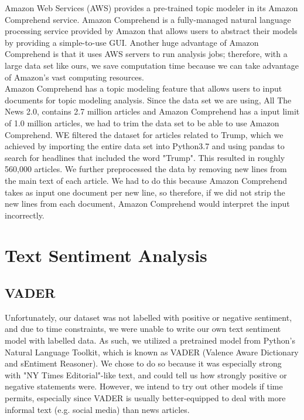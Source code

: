 \documentclass[12pt, letter-paper]{article}
\begin{document}
Amazon Web Services (AWS) provides a pre-trained topic modeler in its Amazon Comprehend service. Amazon Comprehend is a fully-managed natural language processing service provided by Amazon that allows users to abstract their models by providing a simple-to-use GUI. Another huge advantage of Amazon Comprehend is that it uses AWS servers to run analysis jobs; therefore, with a large data set like ours, we save computation time because we can take advantage of Amazon's vast computing resources. \\

Amazon Comprehend has a topic modeling feature that allows users to input documents for topic modeling analysis. Since the data set we are using, All The News 2.0, contains 2.7 million articles and Amazon Comprehend has a input limit of 1.0 million articles, we had to trim the data set to be able to use Amazon Comprehend. WE filtered the dataset for articles related to Trump, which we achieved by importing the entire data set into Python3.7 and using pandas to search for headlines that included the word "Trump". This resulted in roughly 560,000 articles. We further preprocessed the data by removing new lines from the main text of each article. We had to do this because Amazon Comprehend takes as input one document per new line, so therefore, if we did not strip the new lines from each document, Amazon Comprehend would interpret the input incorrectly.

\section{Text Sentiment Analysis}

\subsection{VADER}

Unfortunately, our dataset was not labelled with positive or negative sentiment, and due to time constraints, we were unable to write our own text sentiment model with labelled data. As such, we utilized a pretrained model from Python's Natural Language Toolkit, which is known as VADER (Valence Aware Dictionary and sEntiment Reasoner). We chose to do so because it was especially strong with "NY Times Editorial"-like text, and could tell us how strongly positive or negative statements were. However, we intend to try out other models if time permits, especially since VADER is usually better-equipped to deal with more informal text (e.g. social media) than news articles.
\end{document}
